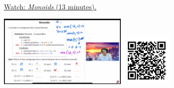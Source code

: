 
\begin{minipage}{10cm}
    \href{https://act4e-spring21.netlify.app/videos/spring2021-semi-mon-gro:monoids.html}{Watch: \emph{Monoids} (13 minutes).}
        
    \href{https://act4e-spring21.netlify.app/videos/spring2021-semi-mon-gro:monoids.html}{\includegraphics[height=3.5cm]{spring2021-semi-mon-gro:monoids/thumbnails.jpg}}
    \href{https://act4e-spring21.netlify.app/videos/spring2021-semi-mon-gro:monoids.html}{\includegraphics[height=2.5cm]{spring2021-semi-mon-gro:monoids/qrcode.png}}
\end{minipage}
